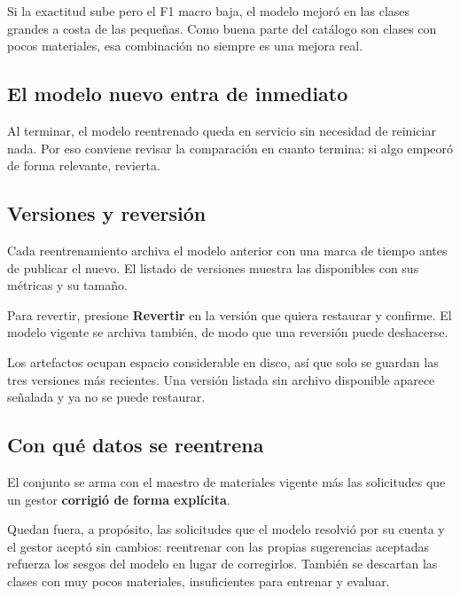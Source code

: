 \begin{nota}
Si la exactitud sube pero el F1 macro baja, el modelo mejoró en las clases
grandes a costa de las pequeñas. Como buena parte del catálogo son clases con
pocos materiales, esa combinación no siempre es una mejora real.
\end{nota}

\subsection{El modelo nuevo entra de inmediato}

Al terminar, el modelo reentrenado queda en servicio sin necesidad de reiniciar
nada. Por eso conviene revisar la comparación en cuanto termina: si algo
empeoró de forma relevante, revierta.

\subsection{Versiones y reversión}

Cada reentrenamiento archiva el modelo anterior con una marca de tiempo antes de
publicar el nuevo. El listado de versiones muestra las disponibles con sus
métricas y su tamaño.


Para revertir, presione \textbf{Revertir} en la versión que quiera restaurar y
confirme. El modelo vigente se archiva también, de modo que una reversión
puede deshacerse.

\begin{nota}
Los artefactos ocupan espacio considerable en disco, así que solo se guardan las
tres versiones más recientes. Una versión listada sin archivo disponible aparece
señalada y ya no se puede restaurar.
\end{nota}

\subsection{Con qué datos se reentrena}

El conjunto se arma con el maestro de materiales vigente más las solicitudes que
un gestor \textbf{corrigió de forma explícita}.

Quedan fuera, a propósito, las solicitudes que el modelo resolvió por su cuenta
y el gestor aceptó sin cambios: reentrenar con las propias sugerencias aceptadas
refuerza los sesgos del modelo en lugar de corregirlos. También se descartan las
clases con muy pocos materiales, insuficientes para entrenar y evaluar.

